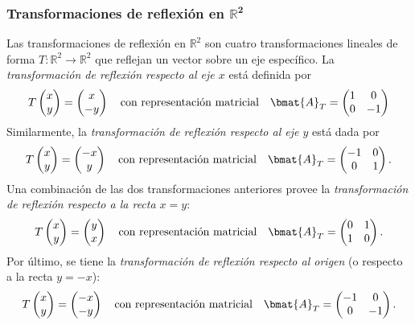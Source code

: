 \documentclass{fmbnotes}
\begin{document}
\subsubsection[Transformaciones de reflexión en \(\mathbb{R}^{2}\)]{Transformaciones de reflexión en \(\bm{\mathbb{R}^{2}}\)} 

Las transformaciones de reflexión en \(\mathbb{R}^{2}\) son cuatro transformaciones lineales de forma \(T\colon\mathbb{R}^{2}\to\mathbb{R}^{2}\) que reflejan un vector sobre un eje específico. La \emph{transformación de reflexión respecto al eje \(x\)} está definida por \[T\begin{pmatrix}
x \\ y
\end{pmatrix}=\begin{pmatrix}
x \\ -y
\end{pmatrix} \quad \text{con representación matricial} \quad \bmat{A}_T=\begin{pmatrix}
1 & 0 \\ 0 & -1
\end{pmatrix}\]
Similarmente, la \emph{transformación de reflexión respecto al eje \(y\)} está dada por \[T\begin{pmatrix}
x \\ y
\end{pmatrix}=\begin{pmatrix}
-x \\ y
\end{pmatrix} \quad \text{con representación matricial} \quad \bmat{A}_T=\begin{pmatrix}
-1 & 0 \\ 0 & 1
\end{pmatrix}.\] 
Una combinación de las dos transformaciones anteriores provee la \emph{transformación de reflexión respecto a la recta \(x=y\)}: 
\[T\begin{pmatrix}
x \\ y
\end{pmatrix}=\begin{pmatrix}
y \\ x
\end{pmatrix} \quad \text{con representación matricial} \quad \bmat{A}_T=\begin{pmatrix}
0 & 1 \\ 1 & 0
\end{pmatrix}.\]
Por último, se tiene la \emph{transformación de reflexión respecto al origen} (o respecto a la recta \(y=-x\)): 
\[T\begin{pmatrix}
x \\ y
\end{pmatrix}=\begin{pmatrix}
-x \\ -y
\end{pmatrix}\quad \text{con representación matricial} \quad \bmat{A}_T=\begin{pmatrix}
-1 & 0 \\ 0 & -1
\end{pmatrix}.\]
\end{document}
